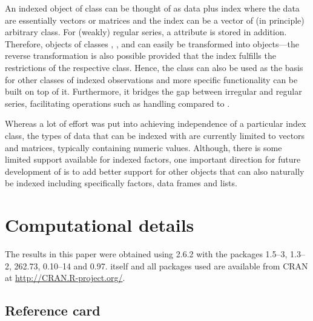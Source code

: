 \documentclass[article,nojss]{jss}
\begin{document}
An indexed object of class  can be thought of as data plus index
where the data are essentially vectors or matrices and the index can be
a vector of (in principle) arbitrary class. For (weakly) regular 
series, a  attribute is stored in addition. Therefore, objects of classes
, ,  and  can easily
be transformed into  objects---the reverse transformation is also possible 
provided that the index fulfills the restrictions of the respective class.
Hence, the  class can also be used as the basis for other
classes of indexed observations and more specific functionality can be built on
top of it. Furthermore, it bridges the gap between irregular and regular series,
facilitating operations such as  handling compared to .

Whereas a lot of effort was put into achieving independence of a particular
index class, the types of data that can be indexed with  are currently
limited to vectors and matrices, typically containing numeric values. Although,
there is some limited support available for indexed factors, one important 
direction for future development of  is to add better support for other
objects that can also naturally be indexed including specifically factors, data
frames and lists.



\section*{Computational details}

The results in this paper were obtained using 
2.6.2 with the packages
 1.5--3,
 1.3--2,
 262.73,
 0.10--14 and
 0.97.
 itself and all packages used are available from
CRAN at \url{http://CRAN.R-project.org/}.




\newpage

\begin{appendix}
\section{Reference card}

\end{appendix}
\end{document}
